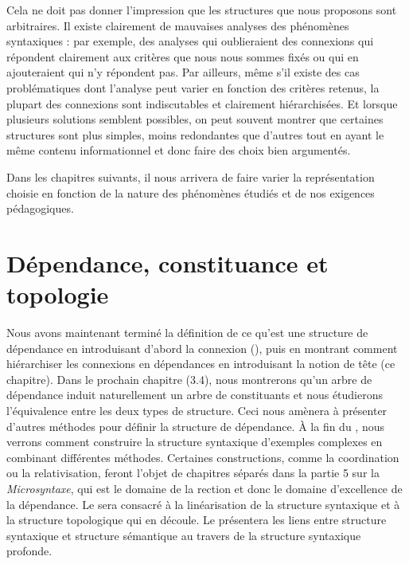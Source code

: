 Cela ne doit pas donner l’impression que les structures que nous proposons sont arbitraires. Il existe clairement de mauvaises analyses des phénomènes syntaxiques : par exemple, des analyses qui oublieraient des connexions qui répondent clairement aux critères que nous nous sommes fixés ou qui en ajouteraient qui n’y répondent pas. Par ailleurs, même s’il existe des cas problématiques dont l’analyse peut varier en fonction des critères retenus, la plupart des connexions sont indiscutables et clairement hiérarchisées. Et lorsque plusieurs solutions semblent possibles, on peut souvent montrer que certaines structures sont plus simples, moins redondantes que d’autres tout en ayant le même contenu informationnel et donc faire des choix bien argumentés.

Dans les chapitres suivants, il nous arrivera de faire varier la représentation choisie en fonction de la nature des phénomènes étudiés et de nos exigences pédagogiques.

\section{Dépendance, constituance et topologie}\label{sec:3.3.34}

Nous avons maintenant terminé la définition de ce qu’est une structure de dépendance en introduisant d’abord la connexion (), puis en montrant comment hiérarchiser les connexions en dépendances en introduisant la notion de tête (ce chapitre). Dans le prochain chapitre (3.4), nous montrerons qu’un arbre de dépendance induit naturellement un arbre de constituants et nous étudierons l’équivalence entre les deux types de structure. Ceci nous amènera à présenter d’autres méthodes pour définir la structure de dépendance. À la fin du , nous verrons comment construire la structure syntaxique d’exemples complexes en combinant différentes méthodes. Certaines constructions, comme la coordination ou la relativisation, feront l’objet de chapitres séparés dans la partie 5 sur la \textit{Microsyntaxe}, qui est le domaine de la rection et donc le domaine d’excellence de la dépendance. Le  sera consacré à la linéarisation de la structure syntaxique et à la structure topologique qui en découle. Le  présentera les liens entre structure syntaxique et structure sémantique au travers de la structure syntaxique profonde.

